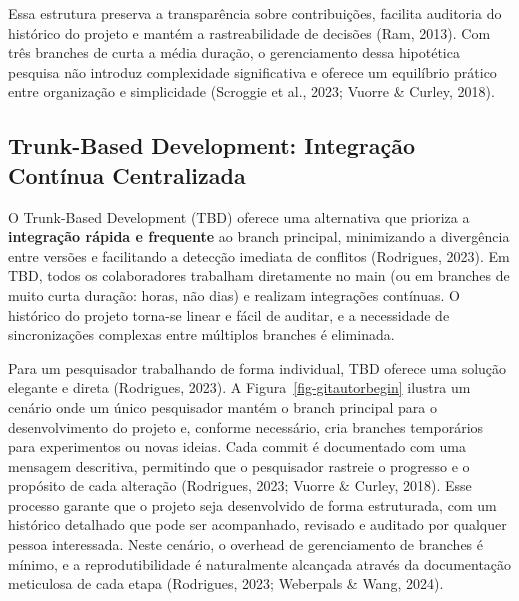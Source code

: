 \documentclass[
  a4paper,
]{book}
\begin{document}
Essa estrutura preserva a transparência sobre contribuições, facilita
auditoria do histórico do projeto e mantém a rastreabilidade de decisões
(Ram, 2013). Com três branches de curta a média duração, o gerenciamento
dessa hipotética pesquisa não introduz complexidade significativa e
oferece um equilíbrio prático entre organização e simplicidade (Scroggie
et al., 2023; Vuorre \& Curley, 2018).

\subsection{Trunk-Based Development: Integração Contínua
Centralizada}\label{trunk-based-development-integrauxe7uxe3o-contuxednua-centralizada}

O Trunk-Based Development (TBD) oferece uma alternativa que prioriza a
\textbf{integração rápida e frequente} ao branch principal, minimizando
a divergência entre versões e facilitando a detecção imediata de
conflitos (Rodrigues, 2023). Em TBD, todos os colaboradores trabalham
diretamente no main (ou em branches de muito curta duração: horas, não
dias) e realizam integrações contínuas. O histórico do projeto torna-se
linear e fácil de auditar, e a necessidade de sincronizações complexas
entre múltiplos branches é eliminada.

Para um pesquisador trabalhando de forma individual, TBD oferece uma
solução elegante e direta (Rodrigues, 2023). A
Figura~\ref{fig-gitautorbegin} ilustra um cenário onde um único
pesquisador mantém o branch principal para o desenvolvimento do projeto
e, conforme necessário, cria branches temporários para experimentos ou
novas ideias. Cada commit é documentado com uma mensagem descritiva,
permitindo que o pesquisador rastreie o progresso e o propósito de cada
alteração (Rodrigues, 2023; Vuorre \& Curley, 2018). Esse processo
garante que o projeto seja desenvolvido de forma estruturada, com um
histórico detalhado que pode ser acompanhado, revisado e auditado por
qualquer pessoa interessada. Neste cenário, o overhead de gerenciamento
de branches é mínimo, e a reprodutibilidade é naturalmente alcançada
através da documentação meticulosa de cada etapa (Rodrigues, 2023;
Weberpals \& Wang, 2024).
\end{document}
